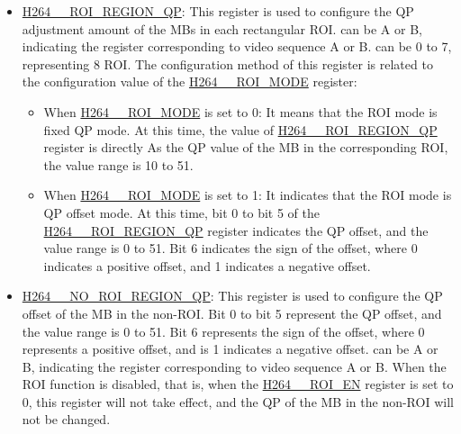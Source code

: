 \documentclass[main\_\_EN.tex]{subfiles}
\begin{document}
\begin{itemize}
\begin{itemize}
            \item \hyperref[fielddesc:H264AROIREGION0Y]{H264\_\_ROI\_REGION\_Y}: Configure the vertical starting MB coordinates of the ROI  in a frame of video.
            \item \hyperref[fielddesc:H264AROIREGION0XLEN]{H264\_\_ROI\_REGION\_X\_LEN}: Configure the number of horizontal MBs in the ROI  in a frame of video.
            \item \hyperref[fielddesc:H264AROIREGION0YLEN]{H264\_\_ROI\_REGION\_Y\_LEN}: Configure the number of vertical MBs in the ROI  in a frame of video.
        \end{itemize}
    \item \hyperref[fielddesc:H264AROIREGION0QP]{H264\_\_ROI\_REGION\_QP}: This register is used to configure the QP adjustment amount of the MBs in each rectangular ROI.  can be A or B, indicating the register corresponding to video sequence A or B.  can be 0 to 7, representing 8 ROI. The configuration method of this register is related to the configuration value of the \hyperref[fielddesc:H264AROIMODE]{H264\_\_ROI\_MODE} register:
        \begin{itemize}
            \item When \hyperref[fielddesc:H264AROIMODE]{H264\_\_ROI\_MODE} is set to 0: It means that the ROI mode is fixed QP mode. At this time, the value of \hyperref[fielddesc:H264AROIREGION0QP]{H264\_\_ROI\_REGION\_QP} register is directly As the QP value of the MB in the corresponding ROI, the value range is 10 to 51.
            \item When \hyperref[fielddesc:H264AROIMODE]{H264\_\_ROI\_MODE} is set to 1: It indicates that the ROI mode is QP offset mode. At this time, bit 0 to bit 5 of the \hyperref[fielddesc:H264AROIREGION0QP]{H264\_\_ROI\_REGION\_QP} register indicates the QP offset, and the value range is 0 to 51. Bit 6 indicates the sign of the offset, where 0 indicates a positive offset, and 1 indicates a negative offset.
        \end{itemize}
    \item \hyperref[fielddesc:H264ANOROIREGIONQP]{H264\_\_NO\_ROI\_REGION\_QP}: This register is used to configure the QP offset of the MB in the non-ROI. Bit 0 to bit 5 represent the QP offset, and the value range is 0 to 51. Bit 6 represents the sign of the offset, where 0 represents a positive offset, and is 1 indicates a negative offset.  can be A or B, indicating the register corresponding to video sequence A or B. When the ROI function is disabled, that is, when the \hyperref[fielddesc:H264AROIEN]{H264\_\_ROI\_EN} register is set to 0, this register will not take effect, and the QP of the MB in the non-ROI will not be changed.
\end{itemize}
\end{document}
